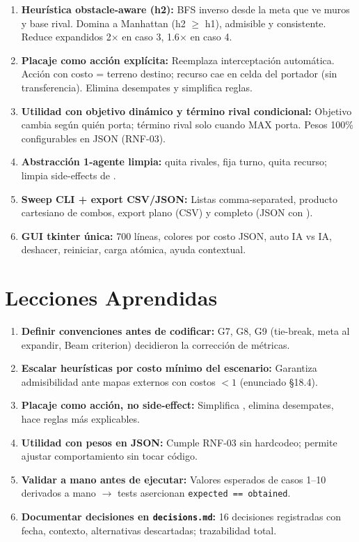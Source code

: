 \begin{enumerate}
\item \textbf{Heurística obstacle-aware (h2):} BFS inverso desde la meta que ve muros y base
  rival. Domina a Manhattan (h2 $\ge$ h1), admisible y consistente. Reduce expandidos
  2$\times$ en caso 3, 1.6$\times$ en caso 4.
\item \textbf{Placaje como acción explícita:} Reemplaza interceptación automática. Acción
   con costo = terreno destino; recurso cae en celda del portador (sin transferencia).
  Elimina desempates y simplifica reglas.
\item \textbf{Utilidad con objetivo dinámico y término rival condicional:} Objetivo cambia según
  quién porta; término rival solo cuando MAX porta. Pesos 100\% configurables en JSON (RNF-03).
\item \textbf{Abstracción 1-agente limpia:}  quita rivales, fija turno,
  quita recurso;  limpia side-effects de .
\item \textbf{Sweep CLI + export CSV/JSON:} Listas comma-separated, producto cartesiano de
  combos, export plano (CSV) y completo (JSON con ).
\item \textbf{GUI tkinter única:} 700 líneas, colores por costo JSON, auto IA vs IA, deshacer,
  reiniciar, carga atómica, ayuda contextual.
\end{enumerate}

\section{Lecciones Aprendidas}
\label{sec:lecciones}

\begin{enumerate}
\item \textbf{Definir convenciones antes de codificar:} G7, G8, G9 (tie-break, meta al expandir,
  Beam criterion) decidieron la corrección de métricas.
\item \textbf{Escalar heurísticas por costo mínimo del escenario:} Garantiza admisibilidad
  ante mapas externos con costos $< 1$ (enunciado §18.4).
\item \textbf{Placaje como acción, no side-effect:} Simplifica , elimina
  desempates, hace reglas más explicables.
\item \textbf{Utilidad con pesos en JSON:} Cumple RNF-03 sin hardcodeo; permite ajustar
  comportamiento sin tocar código.
\item \textbf{Validar a mano antes de ejecutar:} Valores esperados de casos 1--10 derivados
  a mano $\to$ tests asercionan \texttt{expected == obtained}.
\item \textbf{Documentar decisiones en \texttt{decisions.md}:} 16 decisiones registradas con
  fecha, contexto, alternativas descartadas; trazabilidad total.
\end{enumerate}

